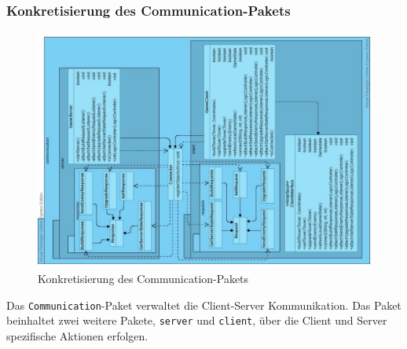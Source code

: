 \documentclass[enabledeprecatedfontcommands,fontsize=12pt,paper=a4,twoside,parskip=half]{scrartcl}
\begin{document}
\subsubsection{Konkretisierung des Communication-Pakets}
\begin{figure}[H]
    \centering
    \includegraphics[width=\textwidth, angle=270]{Bilder/KlassenDiagrammCommunication.pdf}
    \caption{Konkretisierung des Communication-Pakets}
    \label{fig:comPak}
\end{figure}
Das \texttt{Communication}-Paket verwaltet die Client-Server Kommunikation. Das Paket beinhaltet zwei weitere Pakete, \texttt{server} und \texttt{client}, über die Client und Server spezifische Aktionen erfolgen.
\end{document}
